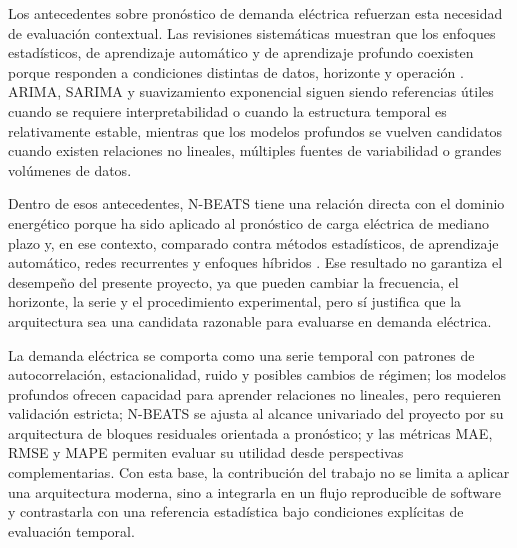 Los antecedentes sobre pronóstico de demanda eléctrica refuerzan esta necesidad de evaluación contextual. Las revisiones sistemáticas muestran que los enfoques estadísticos, de aprendizaje automático y de aprendizaje profundo coexisten porque responden a condiciones distintas de datos, horizonte y operación \parencites{kuster2017,vivas2020,eren2024}. ARIMA, SARIMA y suavizamiento exponencial siguen siendo referencias útiles cuando se requiere interpretabilidad o cuando la estructura temporal es relativamente estable, mientras que los modelos profundos se vuelven candidatos cuando existen relaciones no lineales, múltiples fuentes de variabilidad o grandes volúmenes de datos.

Dentro de esos antecedentes, N-BEATS tiene una relación directa con el dominio energético porque ha sido aplicado al pronóstico de carga eléctrica de mediano plazo y, en ese contexto, comparado contra métodos estadísticos, de aprendizaje automático, redes recurrentes y enfoques híbridos \parencite{oreshkin2021}. Ese resultado no garantiza el desempeño del presente proyecto, ya que pueden cambiar la frecuencia, el horizonte, la serie y el procedimiento experimental, pero sí justifica que la arquitectura sea una candidata razonable para evaluarse en demanda eléctrica.

La demanda eléctrica se comporta como una serie temporal con patrones de autocorrelación, estacionalidad, ruido y posibles cambios de régimen; los modelos profundos ofrecen capacidad para aprender relaciones no lineales, pero requieren validación estricta; N-BEATS se ajusta al alcance univariado del proyecto por su arquitectura de bloques residuales orientada a pronóstico; y las métricas MAE, RMSE y MAPE permiten evaluar su utilidad desde perspectivas complementarias. Con esta base, la contribución del trabajo no se limita a aplicar una arquitectura moderna, sino a integrarla en un flujo reproducible de software y contrastarla con una referencia estadística bajo condiciones explícitas de evaluación temporal.
